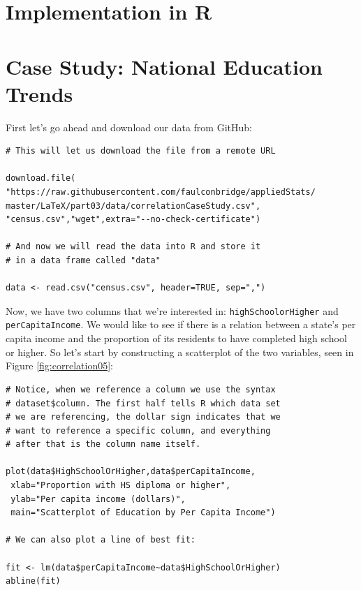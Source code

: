 \section{Implementation in R}

\section{Case Study: National Education Trends}

First let's go ahead and download our data from GitHub:

\begin{framed}
\begin{Verbatim}[samepage=TRUE]
# This will let us download the file from a remote URL

download.file(
"https://raw.githubusercontent.com/faulconbridge/appliedStats/
master/LaTeX/part03/data/correlationCaseStudy.csv",
"census.csv","wget",extra="--no-check-certificate")

# And now we will read the data into R and store it
# in a data frame called "data"

data <- read.csv("census.csv", header=TRUE, sep=",")
\end{Verbatim}
\end{framed}

Now, we have two columns that we're interested in: \verb|highSchoolorHigher| and \verb|perCapitaIncome|. We would like to see if there is a relation between a state's per capita income and the proportion of its residents to have completed high school or higher. So let's start by constructing a scatterplot of the two variables, seen in Figure \ref{fig:correlation05}:

\begin{framed}
\begin{Verbatim}[samepage=TRUE]
# Notice, when we reference a column we use the syntax
# dataset$column. The first half tells R which data set
# we are referencing, the dollar sign indicates that we
# want to reference a specific column, and everything
# after that is the column name itself.

plot(data$HighSchoolOrHigher,data$perCapitaIncome,
 xlab="Proportion with HS diploma or higher",
 ylab="Per capita income (dollars)",
 main="Scatterplot of Education by Per Capita Income")

# We can also plot a line of best fit:

fit <- lm(data$perCapitaIncome~data$HighSchoolOrHigher)
abline(fit)
\end{Verbatim}
\end{framed}

